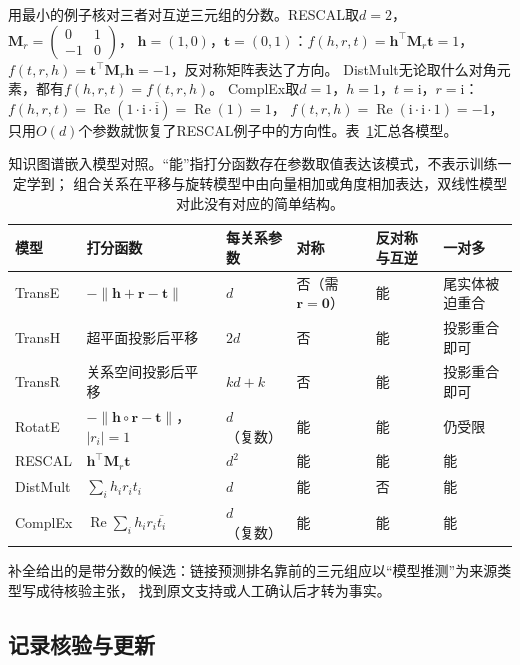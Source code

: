用最小的例子核对三者对互逆三元组的分数。RESCAL取$d=2$，
$\bm{M}_r=\left(\begin{smallmatrix}0&1\\-1&0\end{smallmatrix}\right)$，
$\bm{h}=(1,0)$，$\bm{t}=(0,1)$：$f(h,r,t)=\bm{h}^{\top}\bm{M}_r\bm{t}=1$，
$f(t,r,h)=\bm{t}^{\top}\bm{M}_r\bm{h}=-1$，反对称矩阵表达了方向。
DistMult无论取什么对角元素，都有$f(h,r,t)=f(t,r,h)$。
ComplEx取$d=1$，$h=1$，$t=\mathrm{i}$，$r=\mathrm{i}$：
$f(h,r,t)=\operatorname{Re}(1\cdot\mathrm{i}\cdot\overline{\mathrm{i}})=\operatorname{Re}(1)=1$，
$f(t,r,h)=\operatorname{Re}(\mathrm{i}\cdot\mathrm{i}\cdot1)=-1$，
只用$O(d)$个参数就恢复了RESCAL例子中的方向性。表~\ref{tab:nlp-extraction-kge-models}汇总各模型。

\begin{table}[htbp]
  \centering
  \small
  \begin{tabularx}{\linewidth}{@{}l>{\raggedright\arraybackslash}p{38mm}>{\raggedright\arraybackslash}p{20mm}XXX@{}}
    \toprule
    模型 & 打分函数 & 每关系参数 & 对称 & 反对称与互逆 & 一对多 \\
    \midrule
    TransE & $-\lVert\bm{h}+\bm{r}-\bm{t}\rVert$ & $d$ & 否（需$\bm{r}=\bm{0}$） & 能 & 尾实体被迫重合 \\
    TransH & 超平面投影后平移 & $2d$ & 否 & 能 & 投影重合即可 \\
    TransR & 关系空间投影后平移 & $kd+k$ & 否 & 能 & 投影重合即可 \\
    RotatE & $-\lVert\bm{h}\circ\bm{r}-\bm{t}\rVert$，$|r_i|=1$ & $d$（复数） & 能 & 能 & 仍受限 \\
    RESCAL & $\bm{h}^{\top}\bm{M}_r\bm{t}$ & $d^2$ & 能 & 能 & 能 \\
    DistMult & $\sum_ih_ir_it_i$ & $d$ & 能 & 否 & 能 \\
    ComplEx & $\operatorname{Re}\sum_ih_ir_i\overline{t_i}$ & $d$（复数） & 能 & 能 & 能 \\
    \bottomrule
  \end{tabularx}
  \caption{知识图谱嵌入模型对照。“能”指打分函数存在参数取值表达该模式，不表示训练一定学到；
  组合关系在平移与旋转模型中由向量相加或角度相加表达，双线性模型对此没有对应的简单结构。}
  \label{tab:nlp-extraction-kge-models}
\end{table}

补全给出的是带分数的候选：链接预测排名靠前的三元组应以“模型推测”为来源类型写成待核验主张，
找到原文支持或人工确认后才转为事实。

\subsection{记录核验与更新}
\label{sec:nlp-extraction-update}

